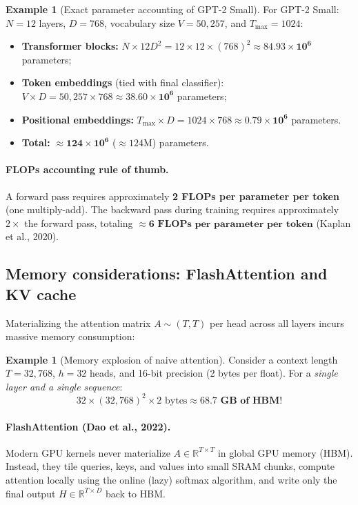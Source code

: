 \documentclass[11pt,a4paper]{article}
\newcommand{\R}{\mathbb{R}}
\newcommand{\slides}[1]{\par\nopagebreak\noindent{\normalfont\small\emph{(slides #1)}}\par\nopagebreak\vspace{2pt}}
\theoremstyle{definition}
\newtheorem{example}[definition]{Example}
\theoremstyle{plain}
\begin{document}
\begin{example}[Exact parameter accounting of GPT-2 Small]
For GPT-2 Small: $N = 12$ layers, $D = 768$, vocabulary size $V = 50{,}257$, and $T_{\max} = 1024$:
\begin{itemize}[nosep]
\item \textbf{Transformer blocks:} $N \times 12 D^2 = 12 \times 12 \times (768)^2 \approx \mathbf{84.93\times 10^6}$ parameters;
\item \textbf{Token embeddings} (tied with final classifier): $V \times D = 50{,}257 \times 768 \approx \mathbf{38.60\times 10^6}$ parameters;
\item \textbf{Positional embeddings:} $T_{\max} \times D = 1024 \times 768 \approx \mathbf{0.79\times 10^6}$ parameters.
\item \textbf{Total:} $\approx \mathbf{124\times 10^6}$ ($\approx 124$M) parameters.
\end{itemize}
\paragraph{FLOPs accounting rule of thumb.}
A forward pass requires approximately \textbf{2 FLOPs per parameter per token} (one multiply-add). The backward pass during training requires approximately $2\times$ the forward pass, totaling $\approx \mathbf{6\text{ FLOPs per parameter per token}}$ (Kaplan et al., 2020).
\end{example}

\subsection{Memory considerations: FlashAttention and KV cache}\slides{74 / 84}
Materializing the attention matrix $A \sim (T, T)$ per head across all layers incurs massive memory consumption:
\begin{example}[Memory explosion of naive attention]
Consider a context length $T = 32{,}768$, $h = 32$ heads, and 16-bit precision (2 bytes per float). For a \emph{single layer and a single sequence}:
\begin{equation*}
32 \times (32{,}768)^2 \times 2 \text{ bytes} \approx \mathbf{68.7\text{ GB of HBM}}!
\end{equation*}
\end{example}

\paragraph{FlashAttention (Dao et al., 2022).}
Modern GPU kernels never materialize $A \in \R^{T \times T}$ in global GPU memory (HBM). Instead, they tile queries, keys, and values into small SRAM chunks, compute attention locally using the online (lazy) softmax algorithm, and write only the final output $H \in \R^{T \times D}$ back to HBM.
\end{document}

